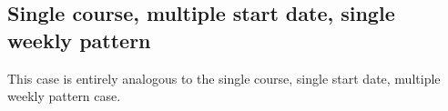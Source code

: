 \subsection{Single course, multiple start date, single weekly pattern}

This case is entirely analogous to the single course, single start date, multiple weekly pattern case.

